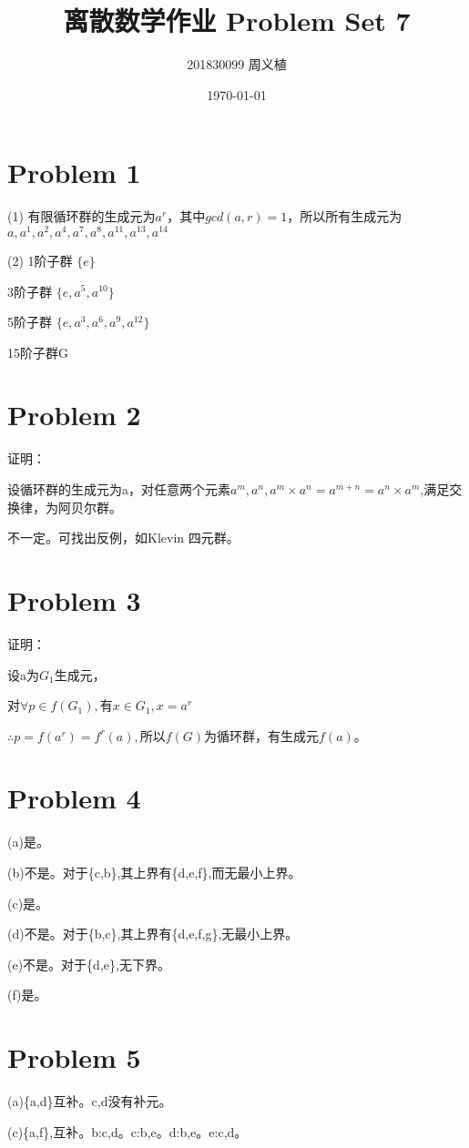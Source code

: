 \documentclass{article}
\title{离散数学作业 Problem Set 7}
\author{201830099 周义植}
\date{\today}
\begin{document}
\maketitle
\section*{Problem 1}
(1)
有限循环群的生成元为$a^r$，其中$gcd(a,r)=1$，所以所有生成元为$a,a^{1},a^{2},a^{4},a^{7},a^{8},a^{11},a^{13},a^{14}$

(2)
1阶子群 $\{e\}$

3阶子群 $\{e,a^{5},a^{10}\}$

5阶子群 $\{e,a^{3},a^{6},a^{9},a^{12}\}$

15阶子群G

\section*{Problem 2}
证明：

设循环群的生成元为a，对任意两个元素$a^m,a^n,a^m\times a^n = a^{m+n} = a^n\times a^m$,满足交换律，为阿贝尔群。

不一定。可找出反例，如Klevin 四元群。

\section*{Problem 3}
证明：

设a为$G_1$生成元，

对$\forall p \in f(G_1),$有$x\in G_1, x=a^r$

$\therefore p=f(a^r)=f^r(a),$所以$f(G)$为循环群，有生成元$f(a)$。

\section*{Problem 4}
(a)是。

(b)不是。对于\{c,b\},其上界有\{d,e,f\},而无最小上界。

(c)是。

(d)不是。对于\{b,c\},其上界有\{d,e,f,g\},无最小上界。

(e)不是。对于\{d,e\},无下界。

(f)是。

\section*{Problem 5}
(a)\{a,d\}互补。c,d没有补元。

(c)\{a,f\},互补。b:c,d。c:b,e。d:b,e。e:c,d。
\end{document}
